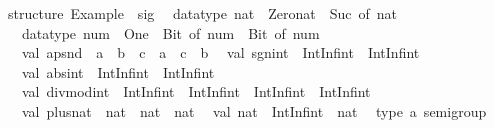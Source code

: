 \begin{isabellebody}
\isamarkuptrue%
%
\isadelimquotetypewriter
%
\endisadelimquotetypewriter
%
\isatagquotetypewriter
%
\begin{isamarkuptext}%
structure\ Example\ {}\ sig\isanewline
\ \ datatype\ nat\ {}\ Zero{}nat\ {}\ Suc\ of\ nat\isanewline
\ \ datatype\ num\ {}\ One\ {}\ Bit{}\ of\ num\ {}\ Bit{}\ of\ num\isanewline
\ \ val\ apsnd\ {}\ {}{}a\ {}{}\ {}b{}\ {}{}\ {}c\ {}\ {}a\ {}{}\ {}c\ {}\ {}b\isanewline
\ \ val\ sgn{}int\ {}\ IntInf{}int\ {}{}\ IntInf{}int\isanewline
\ \ val\ abs{}int\ {}\ IntInf{}int\ {}{}\ IntInf{}int\isanewline
\ \ val\ divmod{}int\ {}\ IntInf{}int\ {}{}\ IntInf{}int\ {}{}\ IntInf{}int\ {}\ IntInf{}int\isanewline
\ \ val\ plus{}nat\ {}\ nat\ {}{}\ nat\ {}{}\ nat\isanewline
\ \ val\ nat\ {}\ IntInf{}int\ {}{}\ nat\isanewline
\ \ type\ {}a\ semigroup\isanewline

\end{isamarkuptext}
\end{isabellebody}
